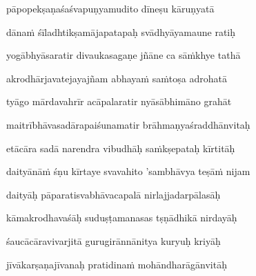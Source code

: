 \ujvers\nemsloka 
pāpopekṣaṇaśaśvapuṇyamudito dīneṣu kāruṇyatā
\dontdisplaylinenum

\nemslokab 
dānaṁ śīladhtikṣamājapatapaḥ svādhyāyamaune ratiḥ \danda\dontdisplaylinenum

\nemslokac 
yogābhyāsaratir divaukasagaṇe jñāne ca sāṁkhye tathā
\dontdisplaylinenum

\nemslokad 
akrodhārjavatejayajñam abhayaṁ saṁtoṣa adrohatā \veg\dontdisplaylinenum
{}

\ujvers\nemsloka 
tyāgo mārdavahrīr acāpalaratir nyāsābhimāno grahāt
\dontdisplaylinenum

\nemslokab 
maitrībhāvasadārapaiśunamatir brāhmaṇyaśraddhānvitaḥ \danda\dontdisplaylinenum

\nemslokac 
etācāra sadā narendra vibudhāḥ saṁkṣepataḥ kīrtitāḥ
\dontdisplaylinenum

\nemslokad 
daityānāṁ śṇu kīrtaye svavahito 'sambhāvya teṣāṁ nijam \veg\dontdisplaylinenum
{}

\ujvers\nemsloka 
daityāḥ pāparatisvabhāvacapalā nirlajjadarpālasāḥ
\dontdisplaylinenum

\nemslokab 
kāmakrodhavaśāḥ suduṣṭamanasas tṣṇādhikā nirdayāḥ \danda\dontdisplaylinenum

\nemslokac 
śaucācāravivarjitā gurugirānnānitya kuryuḥ kriyāḥ
\dontdisplaylinenum

\nemslokad 
jīvākarṣaṇajīvanaḥ pratidinaṁ mohāndharāgānvitāḥ \veg\dontdisplaylinenum
{}


